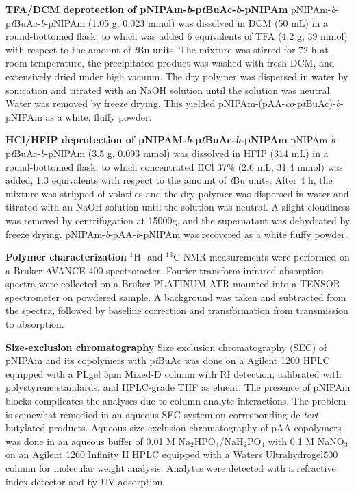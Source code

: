 \documentclass{article}
\begin{document}
\textbf{TFA/DCM deprotection of pNIPAm-\emph{b}-p\emph{t}BuAc-\emph{b}-pNIPAm}
pNIPAm-\emph{b}-p\emph{t}BuAc-\emph{b}-pNIPAm (1.05 g, 0.023 mmol) was dissolved in DCM (50 mL) in a round-bottomed flask, 
to which was added 6 equivalents of TFA (4.2 g, 39 mmol) with respect to the amount of \emph{t}Bu units.
The mixture was stirred for 72 h at room temperature, the precipitated product was washed with fresh DCM,
and extensively dried under high vacuum. The dry polymer was dispersed in water by sonication and 
titrated with an NaOH solution until the solution was neutral. Water was removed by freeze drying.
This yielded pNIPAm-(pAA-\emph{co}-p\emph{t}BuAc)-\emph{b}-pNIPAm as a white, fluffy powder.

\textbf{HCl/HFIP deprotection of pNIPAM-\emph{b}-p\emph{t}BuAc-\emph{b}-pNIPAm}
pNIPAm-\emph{b}-p\emph{t}BuAc-\emph{b}-pNIPAm (3.5 g, 0.093 mmol) was dissolved in HFIP 
(314 mL) in a round-bottomed flask, to which concentrated HCl 37\% (2.6 mL, 31.4 mmol) 
was added, 1.3 equivalents with respect to the amount of \emph{t}Bu units. After 4 h, 
the mixture was stripped of volatiles and the dry polymer was dispersed in 
water and titrated with an NaOH solution until the solution was neutral. A slight cloudiness was removed by
centrifugation at 15000g, and the supernatant was dehydrated by freeze drying. 
pNIPAm-\emph{b}-pAA-\emph{b}-pNIPAm was recovered as a white fluffy powder.

\textbf{Polymer characterization}
$^1$H- and $^{13}$C-NMR measurements were performed on a Bruker AVANCE 400 spectrometer. 
Fourier transform infrared absorption spectra were collected on a Bruker PLATINUM ATR mounted into a TENSOR
spectrometer on powdered sample. A background was taken and subtracted from the spectra, followed by
baseline correction and transformation from transmission to absorption.

\textbf{Size-exclusion chromatography}
Size exclusion chromatography (SEC) 
of pNIPAm and its copolymers with p\emph{t}BuAc was done on a Agilent 1200 
HPLC equipped with a PLgel $5 \mathrm{\mu m}$ 
Mixed-D column with RI detection, calibrated with polystyrene standards, and HPLC-grade 
THF as eluent. The presence of pNIPAm blocks complicates the analyses due to 
column-analyte interactions. The problem is somewhat remedied in an 
aqueous SEC system on corresponding de-\emph{tert}-butylated products. Aqueous size 
exclusion chromatography of pAA copolymers was done in an aqueous buffer of 
0.01 M Na$_2$HPO$_4$/NaH$_2$PO$_4$ with 0.1 M NaNO$_3$ on an Agilent 1260 Infinity 
II HPLC equipped with a Waters Ultrahydrogel500 column for molecular weight analysis.
Analytes were detected with a refractive index detector and by UV adsorption. 
\end{document}
